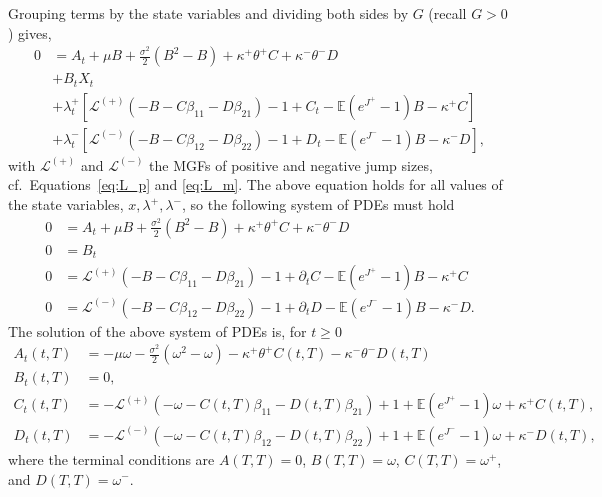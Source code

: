 \documentclass[11pt,a4paper]{article}
\numberwithin{equation}{section}
\theoremstyle{remark}
\theoremstyle{definition}
\newcommand{\E}{{\mathbb{E}}}
\begin{document}
Grouping terms by the state variables and dividing both sides by $G$ (recall $G>0$) gives,
\begin{align*}
    0 &= A_t + \mu B + \frac{\sigma^2}{2}\left(B^2-B\right) + \kappa^+\theta^+C + \kappa^-\theta^-D\\
      &+ B_t X_t \\
      &+ \lambda_t^+\left[\mathcal{L}^{(+)}(-B-C\beta_{11}-D\beta_{21})-1+C_t - \E(e^{J^+}-1)B - \kappa^+C\right]\\
      &+ \lambda_t^-\left[\mathcal{L}^{(-)}(-B-C\beta_{12}-D\beta_{22})-1+D_t- \E(e^{J^-}-1)B - \kappa^-D\right],
\end{align*}
with $\mathcal{L}^{(+)}$ and $\mathcal{L}^{(-)}$ the MGFs of positive and negative jump sizes, cf.\ Equations~\eqref{eq:L_p} and \eqref{eq:L_m}.
The above equation holds for all values of the state variables, $x, \lambda^+, \lambda^-$, so the following system of PDEs must hold
\begin{align*}
    0 &= A_t + \mu B + \frac{\sigma^2}{2}\left(B^2-B\right) + \kappa^+\theta^+C + \kappa^-\theta^-D\\
    0 &= B_t  \\
    0 &= \mathcal{L}^{(+)}(-B-C\beta_{11}-D\beta_{21})-1+\partial_t C - \E(e^{J^+}-1)B - \kappa^+C\\
    0 &= \mathcal{L}^{(-)}(-B-C\beta_{12}-D\beta_{22})-1+\partial_t D - \E(e^{J^-}-1)B - \kappa^-D.
\end{align*}
The solution of the above system of PDEs is, for $t\geq 0$
\begin{align*}
    A_t(t,T) &= - \mu \omega - \frac{\sigma^2}{2}\left(\omega^2-\omega\right) - \kappa^+\theta^+C(t,T) - \kappa^-\theta^-D(t,T)\\
    B_t(t,T) &= 0,\\
    C_t(t,T) &= -\mathcal{L}^{(+)}(-\omega-C(t,T)\beta_{11}-D(t,T)\beta_{21})+1 + \E(e^{J^+}-1)\omega + \kappa^+C(t,T),\\
    D_t(t,T) &= -\mathcal{L}^{(-)}(-\omega-C(t,T)\beta_{12}-D(t,T)\beta_{22})+1 + \E(e^{J^-}-1)\omega + \kappa^-D(t,T),
\end{align*}
where the terminal conditions are $A(T,T)=0$, $B(T,T)=\omega$, $C(T,T)=\omega^+$, and $D(T,T)=\omega^-$.
\end{document}
